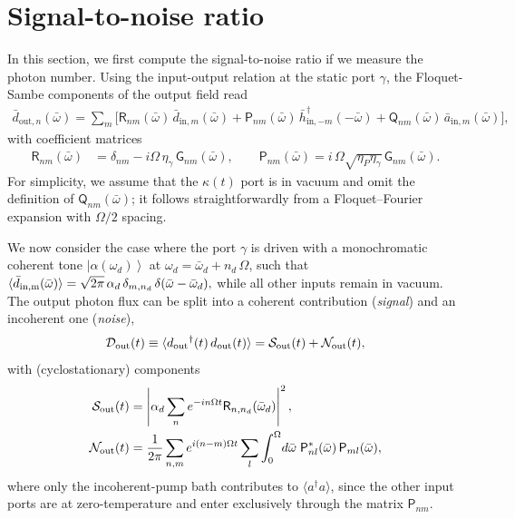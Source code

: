 \documentclass[prl,twocolumn,floatfix,10pt,superscriptaddress]{revtex4-2}
\newcommand{\ket}[1]{\ensuremath{\left|{#1}\right\rangle}}
\newcommand{\msf}[1]{\mathsf{#1}}
\newcommand{\mcl}[1]{\mathcal{#1}}
\newcommand{\msG}{{\msf{G}}}
\newcommand{\msQ}{{\msf{Q}}}
\newcommand{\msP}{{\msf{P}}}
\newcommand{\rmout}{{{\rm out}}}
\begin{document}
\section{Signal-to-noise ratio}
In this section, we first compute the signal-to-noise ratio if we measure the photon number. Using the input-output relation at the static port $\gamma$, the Floquet-Sambe components of the output field read
\begin{align}
\bar{d}_{\text{out},n}(\bar\omega) 
= \sum_m \Big[
\msf{R}_{n m}(\bar\omega)\, \bar{d}_{\text{in},m}(\bar\omega) + \msf{P}_{n m}(\bar\omega)\, \bar{h}_{\text{in},-m}^\dagger(-\bar\omega)
+ \msf{Q}_{n m}(\bar\omega)\, \bar{a}_{\text{in},m}(\bar\omega) 
\Big],
\end{align}
with coefficient matrices 
\begin{align}
\msf{R}_{n m}(\bar\omega) &= \delta_{n m} - i \Omega\,\eta_{\gamma}\,\msG_{n m}(\bar\omega),\qquad
\msP_{n m}(\bar\omega) = i\,\Omega\sqrt{\eta_{P}\eta_{\gamma}}\,\msf{G}_{n m}(\bar\omega).
\end{align}
For simplicity, we assume that the $\kappa(t)$ port is in vacuum and omit the definition of $\msQ_{nm}(\bar{\omega})$; it follows straightforwardly from a Floquet--Fourier expansion with $\Omega/2$ spacing.


We now consider the case where the port $\gamma$ is driven with a monochromatic coherent tone $\ket{\alpha(\omega_d)}$ at $\omega_d=\bar\omega_d+n_d\,\Omega$, such that 
$\langle \bar d_{\rm in,m}(\bar\omega)\rangle = \sqrt{2\pi}\,\alpha_d\,\delta_{m,n_d}\,\delta(\bar\omega-\bar\omega_d),
$ while all other inputs remain in vacuum. The output photon flux can be split into a coherent contribution (\emph{signal}) and an incoherent one (\emph{noise}),
\begin{align}
\mcl{D}_{\rmout}(t)\equiv \langle d_{\rm out}{}^\dag(t)\,d_{\rm out}(t)\rangle
=\mcl{S}_{\rm out}(t)+\mcl{N}_{\rm out}(t),
\end{align}
with (cyclostationary) components
\begin{align}
\mcl{S}_{\rmout}(t)&=\left|\alpha_d\sum_n e^{-i n \Omega t} \msf{R}_{n,n_d}(\bar\omega_d)\right|^2,\\
\mcl{N}_{\rm out}(t)&=\frac{1}{2\pi} \sum_{n,m}e^{i(n-m)\Omega t}
\sum_{l}\int_0^{\Omega}\! d\bar\omega \;
\msf{P}^*_{n l}(\bar\omega)\,\msf{P}_{m l}(\bar\omega),
\end{align}
where only the incoherent-pump bath contributes to $\langle a^\dag a\rangle$, since the other input ports are at zero-temperature and enter exclusively through the matrix $\msf{P}_{nm}$.
\end{document}
